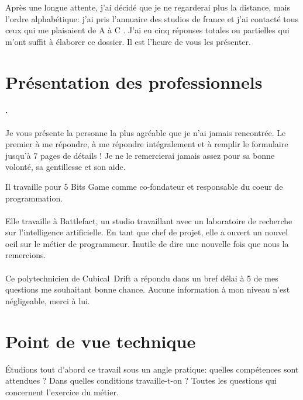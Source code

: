 \documentclass[12pt, a4paper]{report} %
\begin{document}
Après une longue attente, j'ai décidé que je ne regarderai plus la distance, mais l'ordre alphabétique: j'ai pris l'annuaire des studios de france et j'ai contacté tous ceux qui me plaisaient de A à C . J'ai eu cinq réponses totales ou partielles qui m'ont suffit à élaborer ce dossier. Il est l'heure de vous les présenter.

\section{Présentation des professionnels}
\paragraph{\agg{}.}
Je vous présente la personne la plus agréable que je n'ai jamais rencontrée. Le premier à me répondre, à me répondre intégralement et à remplir le formulaire jusqu'à 7 pages de détails ! Je ne le remercierai jamais assez pour sa bonne volonté, sa gentillesse et son aide. 

Il travaille pour 5 Bits Game  comme co-fondateur et responsable du coeur de programmation.

\paragraph{\sr{}}
Elle travaille à Battlefact, un studio travaillant avec un laboratoire de recherche sur l'intelligence artificielle. En tant que chef de projet, elle a ouvert un nouvel oeil sur le métier de programmeur. Inutile de dire une nouvelle fois que nous la remercions.

\paragraph{\cubical{}}
Ce polytechnicien de Cubical~Drift  a répondu dans un bref délai à 5 de mes questions me souhaitant bonne chance. Aucune information à mon niveau n'est négligeable, merci à lui.

\section{Point de vue technique}
Étudions tout d'abord ce travail sous un angle pratique: quelles compétences sont attendues ? Dans quelles conditions travaille-t-on ? Toutes les questions qui concernent l'exercice du métier.
\end{document}
